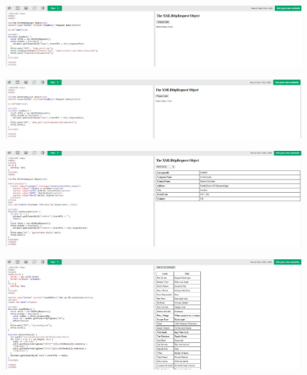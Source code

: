 \documentclass{article}
\begin{document}
\begin{itemize}
\begin{figure}[H]
		\end{figure}
		\begin{figure}[H]
			\centering
			\includegraphics[width=1.0\textwidth,keepaspectratio]{img/w9.jpg}
		\end{figure}
		\begin{figure}[H]
			\centering
			\includegraphics[width=1.0\textwidth,keepaspectratio]{img/w10.jpg}
		\end{figure}
		\begin{figure}[H]
			\centering
			\includegraphics[width=1.0\textwidth,keepaspectratio]{img/w11.jpg}
		\end{figure}
		\begin{figure}[H]
			\centering
			\includegraphics[width=1.0\textwidth,keepaspectratio]{img/w12.jpg}

\end{figure}
\end{itemize}
\end{document}
